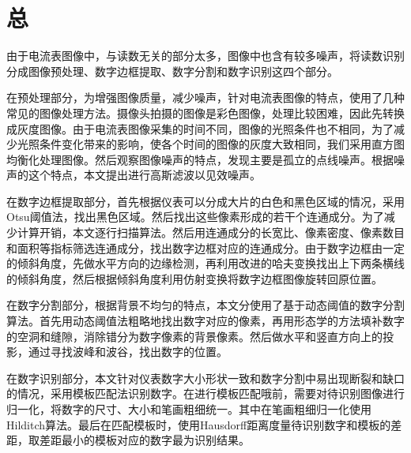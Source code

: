 
\chapter*{总}

由于电流表图像中，与读数无关的部分太多，图像中也含有较多噪声，将读数识别分成图像预处理、数字边框提取、数字分割和数字识别这四个部分。

在预处理部分，为增强图像质量，减少噪声，针对电流表图像的特点，使用了几种常见的图像处理方法。摄像头拍摄的图像是彩色图像，处理比较困难，因此先转换成灰度图像。由于电流表图像采集的时间不同，图像的光照条件也不相同，为了减少光照条件变化带来的影响，使各个时间的图像的灰度大致相同，我们采用直方图均衡化处理图像。然后观察图像噪声的特点，发现主要是孤立的点线噪声。根据噪声的这个特点，本文提出进行高斯滤波以见效噪声。

在数字边框提取部分，首先根据仪表可以分成大片的白色和黑色区域的情况，采用Otsu阈值法，找出黑色区域。然后找出这些像素形成的若干个连通成分。为了减少计算开销，本文逐行扫描算法。然后用连通成分的长宽比、像素密度、像素数目和面积等指标筛选连通成分，找出数字边框对应的连通成分。由于数字边框由一定的倾斜角度，先做水平方向的边缘检测，再利用改进的哈夫变换找出上下两条横线的倾斜角度，然后根据倾斜角度利用仿射变换将数字边框图像旋转回原位置。

在数字分割部分，根据背景不均匀的特点，本文分使用了基于动态阈值的数字分割算法。首先用动态阈值法粗略地找出数字对应的像素，再用形态学的方法填补数字的空洞和缝隙，消除错分为数字像素的背景像素。然后做水平和竖直方向上的投影，通过寻找波峰和波谷，找出数字的位置。

在数字识别部分，本文针对仪表数字大小形状一致和数字分割中易出现断裂和缺口的情况，采用模板匹配法识别数字。在进行模板匹配哦前，需要对待识别图像进行归一化，将数字的尺寸、大小和笔画粗细统一。其中在笔画粗细归一化使用Hilditch算法。最后在匹配模板时，使用Hausdorff距离度量待识别数字和模板的差距，取差距最小的模板对应的数字最为识别结果。

